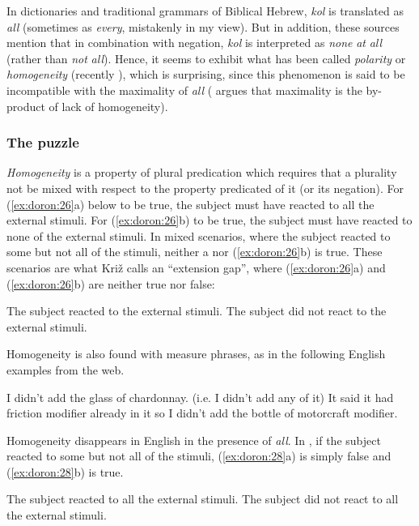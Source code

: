 \documentclass[output=paper]{langsci/langscibook}
\begin{document}
In dictionaries and traditional grammars of Biblical Hebrew, \textit{kol} is translated as \textit{all} (sometimes as \textit{every}, mistakenly in my view). But in addition, these sources mention that in combination with negation, \textit{kol} is interpreted as \textit{none} \textit{at} \textit{all} (rather than \textit{not} \textit{all}). Hence, it seems to exhibit what has been called \textit{polarity} \citep{Löbner2000} or \textit{homogeneity} (recently \citealt{Križ2016}), which is surprising, since this phenomenon is said to be incompatible with the maximality of \textit{all} (\citealt{Križ2016} argues that maximality is the by-product of lack of homogeneity).

\subsubsection{The puzzle}%

\textit{Homogeneity} is a property of plural predication which requires that a plurality not be mixed with respect to the property predicated of it (or its negation). For (\ref{ex:doron:26}a) below to be true, the subject must have reacted to all the external stimuli. For (\ref{ex:doron:26}b) to be true, the subject must have reacted to none of the external stimuli. In mixed scenarios, where the subject reacted to some but not all of the stimuli, neither a nor (\ref{ex:doron:26}b) is true. These scenarios are what Križ calls an “extension gap”, where (\ref{ex:doron:26}a) and (\ref{ex:doron:26}b) are neither true nor false:

\ea%
    \label{ex:doron:26}
\ea The subject reacted to the external stimuli.
\ex The subject did not react to the external stimuli.
\z
\z

Homogeneity is also found with measure phrases, as in the following English examples from the web.

\ea%
    \label{ex:doron:27}
    \ea I didn't add the glass of chardonnay.   (i.e. I didn’t add any of it)
    \ex It said it had friction modifier already in it so I didn't add the bottle of motorcraft modifier.
\z
\z

Homogeneity disappears in English in the presence of \textit{all}. In , if the subject reacted to some but not all of the stimuli, (\ref{ex:doron:28}a) is simply false and (\ref{ex:doron:28}b) is true.

\ea%
    \label{ex:doron:28}
    \ea The subject reacted to all the external stimuli.
    \ex The subject did not react to all the external stimuli.
\z
\z
\end{document}
